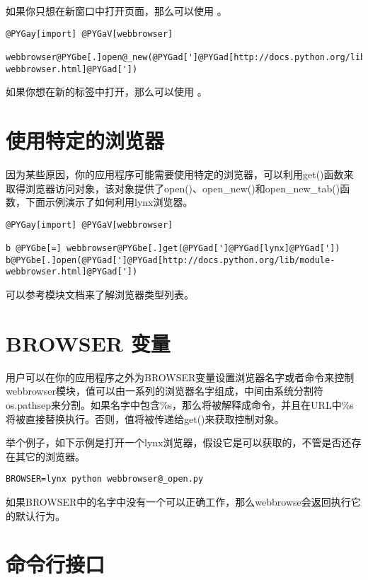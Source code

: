 \documentclass[a4paper,10pt,english]{manual}
\begin{document}
如果你只想在新窗口中打开页面，那么可以使用  。

\begin{Verbatim}[commandchars=@\[\]]
@PYGay[import] @PYGaV[webbrowser]

webbrowser@PYGbe[.]open@_new(@PYGad[']@PYGad[http://docs.python.org/lib/module-webbrowser.html]@PYGad['])
\end{Verbatim}

如果你想在新的标签中打开，那么可以使用  。


\section{使用特定的浏览器}

因为某些原因，你的应用程序可能需要使用特定的浏览器，可以利用get()函数来取得浏览器访问对象，该对象提供了open()、open\_new()和open\_new\_tab()函数，下面示例演示了如何利用lynx浏览器。

\begin{Verbatim}[commandchars=@\[\]]
@PYGay[import] @PYGaV[webbrowser]

b @PYGbe[=] webbrowser@PYGbe[.]get(@PYGad[']@PYGad[lynx]@PYGad['])
b@PYGbe[.]open(@PYGad[']@PYGad[http://docs.python.org/lib/module-webbrowser.html]@PYGad['])
\end{Verbatim}

可以参考模块文档来了解浏览器类型列表。


\section{BROWSER 变量}

用户可以在你的应用程序之外为BROWSER变量设置浏览器名字或者命令来控制webbrowser模块，值可以由一系列的浏览器名字组成，中间由系统分割符os.pathsep来分割。如果名字中包含\%s，那么将被解释成命令，并且在URL中\%s将被直接替换执行。否则，值将被传递给get()来获取控制对象。

举个例子，如下示例是打开一个lynx浏览器，假设它是可以获取的，不管是否还存在其它的浏览器。

\begin{Verbatim}[commandchars=@\[\]]
BROWSER=lynx python webbrowser@_open.py
\end{Verbatim}

如果BROWSER中的名字中没有一个可以正确工作，那么webbrowse会返回执行它的默认行为。


\section{命令行接口}
\end{document}
